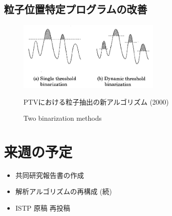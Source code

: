 \documentclass[twocolumn,a4j]{jsarticle}
\begin{document}
\subsection{粒子位置特定プログラムの改善}
\begin{figure}[htbp]
  \footnotesize
  \begin{center}
    \includegraphics[width=70mm]{../images/binarizatoin_method.png}
    \caption{Two binarization methods}
    PTVにおける粒子抽出の新アルゴリズム (2000)
  \end{center}
\end{figure}

\section{来週の予定}
\begin{itemize}
  \item 共同研究報告書の作成
  \item 解析アルゴリズムの再構成 (続)
  \item ISTP 原稿 再投稿
\end{itemize}
\end{document}
